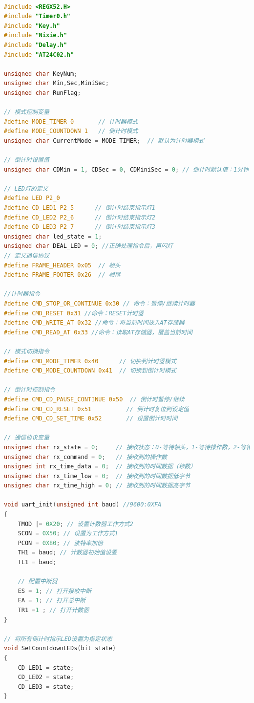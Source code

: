 \documentclass[12pt,hyperref,a4paper,UTF8]{ctexart}
\begin{document}
\begin{lstlisting}[language=C, caption={main.c 核心功能实现代码}]

#include <REGX52.H>
#include "Timer0.h"
#include "Key.h"
#include "Nixie.h"
#include "Delay.h"
#include "AT24C02.h"

unsigned char KeyNum;
unsigned char Min,Sec,MiniSec;
unsigned char RunFlag;

// 模式控制变量
#define MODE_TIMER 0       // 计时器模式
#define MODE_COUNTDOWN 1   // 倒计时模式
unsigned char CurrentMode = MODE_TIMER;  // 默认为计时器模式

// 倒计时设置值
unsigned char CDMin = 1, CDSec = 0, CDMiniSec = 0; // 倒计时默认值：1分钟

// LED灯的定义
#define LED P2_0
#define CD_LED1 P2_5      // 倒计时结束指示灯1
#define CD_LED2 P2_6      // 倒计时结束指示灯2
#define CD_LED3 P2_7      // 倒计时结束指示灯3
unsigned char led_state = 1;    
unsigned char DEAL_LED = 0; //正确处理指令后，再闪灯
// 定义通信协议
#define FRAME_HEADER 0x05  // 帧头
#define FRAME_FOOTER 0x26  // 帧尾

//计时器指令
#define CMD_STOP_OR_CONTINUE 0x30 // 命令：暂停/继续计时器 
#define CMD_RESET 0x31 //命令：RESET计时器
#define CMD_WRITE_AT 0x32 //命令：将当前时间放入AT存储器
#define CMD_READ_AT 0x33 //命令：读取AT存储器，覆盖当前时间

// 模式切换指令
#define CMD_MODE_TIMER 0x40      // 切换到计时器模式
#define CMD_MODE_COUNTDOWN 0x41  // 切换到倒计时模式

// 倒计时控制指令
#define CMD_CD_PAUSE_CONTINUE 0x50  // 倒计时暂停/继续
#define CMD_CD_RESET 0x51          // 倒计时复位到设定值
#define CMD_CD_SET_TIME 0x52       // 设置倒计时时间

// 通信协议变量
unsigned char rx_state = 0;     // 接收状态：0-等待帧头，1-等待操作数，2-等待数据低字节，3-等待数据高字节，4-等待帧尾
unsigned char rx_command = 0;   // 接收到的操作数
unsigned int rx_time_data = 0;  // 接收到的时间数据（秒数）
unsigned char rx_time_low = 0;  // 接收到的时间数据低字节
unsigned char rx_time_high = 0; // 接收到的时间数据高字节

void uart_init(unsigned int baud) //9600:0XFA
{
	TMOD |= 0X20; // 设置计数器工作方式2
	SCON = 0X50; // 设置为工作方式1
	PCON = 0X80; // 波特率加倍
	TH1 = baud; // 计数器初始值设置
	TL1 = baud;

	// 配置中断器
	ES = 1; // 打开接收中断
	EA = 1; // 打开总中断
	TR1 =1 ; // 打开计数器		
}

// 将所有倒计时指示LED设置为指定状态
void SetCountdownLEDs(bit state)
{
    CD_LED1 = state;
    CD_LED2 = state;
    CD_LED3 = state;
}


\end{lstlisting}
\end{document}
